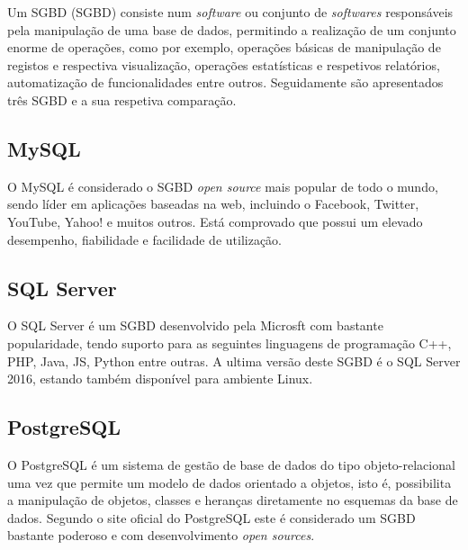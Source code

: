 Um \acl{SGBD} (\acs{SGBD}) consiste num \textit{software} ou conjunto de \textit{softwares} responsáveis pela manipulação de uma base de dados, permitindo a realização de um conjunto enorme de operações, como por exemplo, operações básicas de manipulação de registos e respectiva visualização, operações estatísticas e respetivos relatórios, automatização de funcionalidades entre outros. Seguidamente são apresentados três \ac{SGBD} e a sua respetiva comparação. 


\subsection{MySQL}


O MySQL é considerado o \ac{SGBD} \textit{open source} mais popular de todo o mundo, sendo líder em aplicações baseadas na web, incluindo o Facebook, Twitter, YouTube, Yahoo! e muitos outros. Está comprovado que possui um elevado desempenho, fiabilidade e facilidade de utilização\cite{MySQL2011}.	






\subsection{SQL Server}

O SQL Server é um \ac{SGBD} desenvolvido pela Microsft com bastante popularidade, tendo suporto para as seguintes linguagens de programação C++, PHP, Java, \ac{JS}, Python entre outras. A ultima versão deste \ac{SGBD} é o SQL Server 2016, estando também disponível para ambiente Linux\cite{linuxsqlserver}.




\subsection{PostgreSQL}

O PostgreSQL é um sistema de gestão de base de dados do tipo objeto-relacional uma vez que permite um modelo de dados orientado a objetos, isto é, possibilita a manipulação de objetos, classes e heranças diretamente no esquemas da base de dados. Segundo o site oficial do PostgreSQL este é considerado um \ac{SGBD} bastante poderoso e com desenvolvimento \textit{open sources}\cite{ThePostgreSQLGlobalDevelopmentGroup2012}. 





